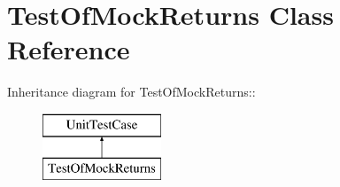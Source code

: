 \hypertarget{class_test_of_mock_returns}{
\section{TestOfMockReturns Class Reference}
\label{class_test_of_mock_returns}
}
Inheritance diagram for TestOfMockReturns::\begin{figure}[H]
\begin{center}
\leavevmode
\includegraphics[height=2cm]{class_test_of_mock_returns}
\end{center}
\end{figure}
